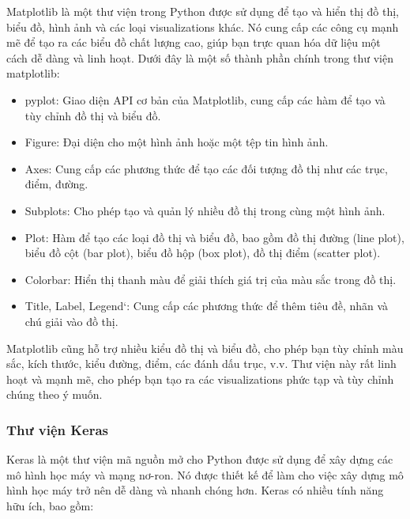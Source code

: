 Matplotlib là một thư viện trong Python được sử dụng để tạo và hiển thị đồ thị, biểu đồ, hình ảnh và các loại visualizations khác. Nó cung cấp các công cụ mạnh mẽ để tạo ra các biểu đồ chất lượng cao, giúp bạn trực quan hóa dữ liệu một cách dễ dàng và linh hoạt. Dưới đây là một số thành phần chính trong thư viện matplotlib:

\begin{itemize}
	\item pyplot: Giao diện API cơ bản của Matplotlib, cung cấp các hàm để tạo và tùy chỉnh đồ thị và biểu đồ.
	
	\item Figure: Đại diện cho một hình ảnh hoặc một tệp tin hình ảnh.
	
	\item Axes: Cung cấp các phương thức để tạo các đối tượng đồ thị như các trục, điểm, đường.
	
	\item Subplots: Cho phép tạo và quản lý nhiều đồ thị trong cùng một hình ảnh.
	
	\item Plot: Hàm để tạo các loại đồ thị và biểu đồ, bao gồm đồ thị đường (line plot), biểu đồ cột (bar plot), biểu đồ hộp (box plot), đồ thị điểm (scatter plot).
	
	\item Colorbar: Hiển thị thanh màu để giải thích giá trị của màu sắc trong đồ thị.
	
	\item Title, Label, Legend`: Cung cấp các phương thức để thêm tiêu đề, nhãn và chú giải vào đồ thị.
\end{itemize}

Matplotlib cũng hỗ trợ nhiều kiểu đồ thị và biểu đồ, cho phép bạn tùy chỉnh màu sắc, kích thước, kiểu đường, điểm, các đánh dấu trục, v.v. Thư viện này rất linh hoạt và mạnh mẽ, cho phép bạn tạo ra các visualizations phức tạp và tùy chỉnh chúng theo ý muốn.

\subsubsection{Thư viện Keras}

Keras là một thư viện mã nguồn mở cho Python được sử dụng để xây dựng các mô hình học máy và mạng nơ-ron. Nó được thiết kế để làm cho việc xây dựng mô hình học máy trở nên dễ dàng và nhanh chóng hơn. Keras có nhiều tính năng hữu ích, bao gồm:

